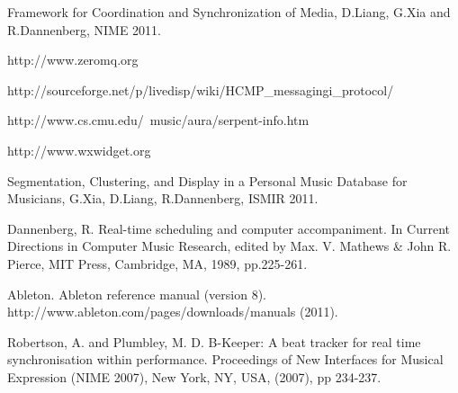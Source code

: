 \documentclass[12pt]{Latex/Classes/PhDthesisPSnPDF}
\begin{document}
\setcounter{page}{2}

\frontmatter



\setcounter{secnumdepth}{3} %
\setcounter{tocdepth}{3}    %
\tableofcontents %

\listoffigures	%

\listoftables

\newpage %


\pagestyle{headings}
\setcounter{page}{1}

\mainmatter
\renewcommand{\chaptername}{} %



			
	
%





\begin{thebibliography}{pubext}
%

Framework for Coordination and Synchronization of Media, D.Liang, G.Xia and R.Dannenberg, NIME 2011.

http://www.zeromq.org

http://sourceforge.net/p/livedisp/wiki/HCMP\_messagingi\_protocol/

http://www.cs.cmu.edu/~music/aura/serpent-info.htm

http://www.wxwidget.org

Segmentation, Clustering, and Display in a Personal Music Database for Musicians,
G.Xia, D.Liang, R.Dannenberg, ISMIR 2011.

Dannenberg, R. Real-time scheduling and computer accompaniment. In Current
Directions in Computer Music Research, edited by Max. V. Mathews \& John R.
Pierce, MIT Press, Cambridge, MA, 1989, pp.225-261.

Ableton. Ableton reference manual (version 8).
http://www.ableton.com/pages/downloads/manuals (2011).

Robertson, A. and Plumbley, M. D. B-Keeper: A beat tracker for real time
synchronisation within performance. Proceedings of New Interfaces for Musical
Expression (NIME 2007), New York, NY, USA, (2007), pp 234-237.

\end{thebibliography}


\end{document}
